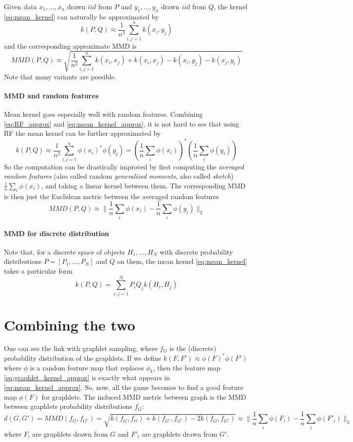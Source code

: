 \documentclass{article}
\begin{document}
Given data $x_1, \ldots, x_n$ drawn $iid$ from $P$ and $y_1, \ldots, y_n$ drawn $iid$ from $Q$, the kernel \eqref{eq:mean_kernel} can naturally be approximated by
\begin{equation}\label{eq:mean_kernel_approx}
k(P,Q) \approx \frac{1}{n^2} \sum_{i,j=1}^n k(x_i,y_j)
\end{equation}
and the corresponding approximate MMD is
\[
MMD(P,Q) \approx \sqrt{\frac{1}{n^2} \sum_{i,j=1}^n k(x_i,x_j) + k(x_i,x_j) - k(x_i,y_j) - k(x_j, y_i)}
\]
Note that many variants are possible.

\paragraph{MMD and random features} Mean kernel goes especially well with random features. Combining \eqref{eq:RF_approx} and \eqref{eq:mean_kernel_approx}, it is not hard to see that using RF the mean kernel can be further approximated by
\begin{equation}
\label{eq:mean_kernel_RF}
k(P,Q) \approx \frac{1}{n^2} \sum_{i,j=1}^n \phi(x_i)^*\phi(y_j) = \left(\frac{1}{n} \sum_i \phi(x_i)\right)^* \left(\frac{1}{n} \sum_i \phi(y_i)\right)
\end{equation}
So the computation can be drastically improved by first computing the \emph{averaged random features} (also called random \emph{generalized moments}, also called \emph{sketch}) $\frac{1}{n} \sum_i \phi(x_i)$, and taking a linear kernel between them. The corresponding MMD is then just the Euclidean metric between the averaged random features
\[
MMD(P,Q) \approx \| \frac{1}{n} \sum_i \phi(x_i) - \frac{1}{n} \sum_i \phi(y_i)\|_2
\]

\paragraph{MMD for discrete distribution} Note that, for a discrete space of objects $H_1, \ldots, H_N$ with discrete probability distributions $P = [P_1, \ldots, P_N]$ and $Q$ on them, the mean kernel \eqref{eq:mean_kernel} takes a particular form
\[
k(P,Q) = \sum_{i,j=1}^N P_i Q_j k(H_i, H_j)
\]

\section{Combining the two}

One can see the link with graphlet sampling, where $f_G$ is the (discrete) probability distribution of the graphlets. If we define $k(F, F') \approx \phi(F)^*\phi(F')$ where $\phi$ is a random feature map that replaces $\phi_k$, then the feature map \eqref{eq:graphlet_kernel_approx} is exactly what appears in \eqref{eq:mean_kernel_approx}. So, now, all the game becomes to find a good feature map $\phi(F)$ for graphlets. The induced MMD metric between graph is the MMD between graphlets probability distributions $f_G$:
\[
d(G,G') = MMD(f_G, f_{G'}) = \sqrt{k(f_G, f_{G}) + k(f_{G'}, f_{G'}) - 2 k(f_G, f_{G'})} \approx \| \frac{1}{n} \sum_i \phi(F_i) - \frac{1}{n} \sum_i \phi(F'_i)\|_2
\]
where $F_i$ are graphlets drawn from $G$ and $F'_i$ are graphlets drawn from $G'$.
\end{document}
